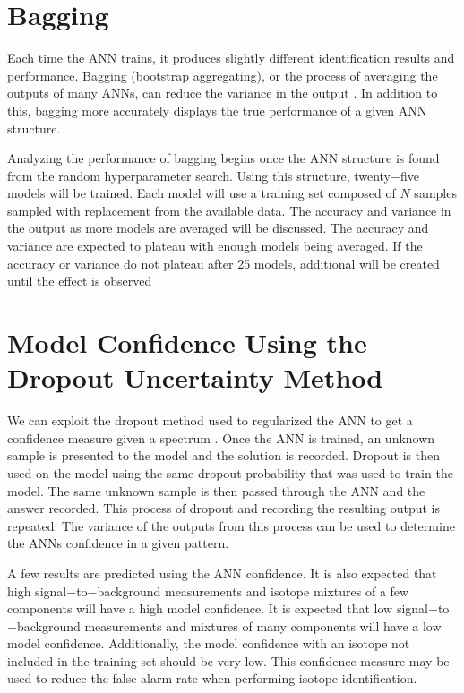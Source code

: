 \documentclass[tocnosub,noragright,centerchapter,12pt,fullpage]{uiucecethesis09}
\begin{document}
\section{Bagging}
Each time the ANN trains, it produces slightly different identification results and performance. Bagging (bootstrap aggregating), or the process of averaging the outputs of many ANNs, can reduce the variance in the output \cite{Breiman1996}. In addition to this, bagging more accurately displays the true performance of a given ANN structure.

Analyzing the performance of bagging begins once the ANN structure is found from the random hyperparameter search. Using this structure, twenty$-$five models will be trained. Each model will use a training set composed of $N$ samples sampled with replacement from the available data. The accuracy and variance in the output as more models are averaged will be discussed. The accuracy and variance are expected to plateau with enough models being averaged. If the accuracy or variance do not plateau after 25 models, additional will be created until the effect is observed



\section{Model Confidence Using the Dropout Uncertainty Method} \label{ModelConfidence}

We can exploit the dropout method used to regularized the ANN to get a confidence measure given a spectrum \cite{Yarin2016}. Once the ANN is trained, an unknown sample is presented to the model and the solution is recorded. Dropout is then used on the model using the same dropout probability that was used to train the model. The same unknown sample is then passed through the ANN and the answer recorded. This process of dropout and recording the resulting output is repeated. The variance of the outputs from this process can be used to determine the ANNs confidence in a given pattern. 

A few results are predicted using the ANN confidence. It is also expected that high signal$-$to$-$background measurements and isotope mixtures of a few components will have a high model confidence. It is expected that low signal$-$to$-$background measurements and mixtures of many components will have a low model confidence. Additionally, the model confidence with an isotope not included in the training set should be very low. This confidence measure may be used to reduce the false alarm rate when performing isotope identification. 
\end{document}
